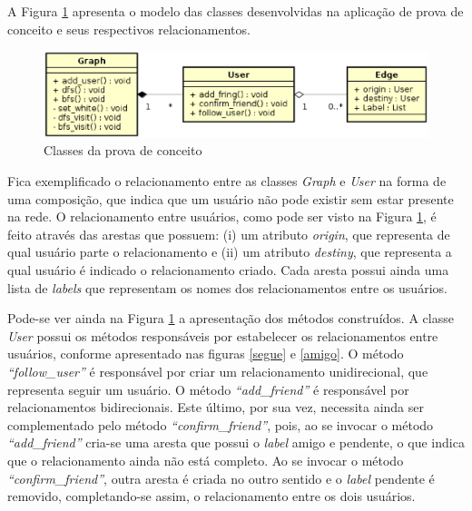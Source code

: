 \begin{apendicesenv}
A Figura \ref{modelo prova de conceito} apresenta o modelo das classes desenvolvidas na aplicação de prova de conceito e seus respectivos relacionamentos.

\begin{figure}[!h]
	\centering
	\includegraphics[scale=0.8]{figuras/proposta/classes_prova_conceito.eps}
	\caption{Classes da prova de conceito}
	\label{modelo prova de conceito}
\end{figure}

Fica exemplificado o relacionamento entre as classes \textit{Graph} e \textit{User} na forma de uma composição, que indica que um usuário não pode existir sem estar presente na rede. O relacionamento entre usuários, como pode ser visto na Figura \ref{modelo prova de conceito}, é feito através das arestas que possuem: (i) um atributo \textit{origin}, que representa de qual usuário parte o relacionamento e (ii) um atributo \textit{destiny}, que representa a qual usuário é indicado o relacionamento criado. Cada aresta possui ainda uma lista de \textit{labels} que representam os nomes dos relacionamentos entre os usuários.

Pode-se ver ainda na Figura \ref{modelo prova de conceito} a apresentação dos métodos construídos. A classe \textit{User} possui os métodos responsáveis por estabelecer os relacionamentos entre usuários, conforme apresentado nas figuras \ref{segue} e \ref{amigo}. O método \textit{``follow\_user''} é responsável por criar um relacionamento unidirecional, que representa seguir um usuário. O método \textit{``add\_friend''} é responsável por relacionamentos bidirecionais. Este último, por sua vez, necessita ainda ser complementado pelo método \textit{``confirm\_friend''}, pois, ao se invocar o método \textit{``add\_friend''} cria-se uma aresta que possui o \textit{label} amigo e pendente, o que indica que o relacionamento ainda não está completo. Ao se invocar o método \textit{``confirm\_friend''}, outra aresta é criada no outro sentido e o \textit{label} pendente é removido, completando-se assim, o relacionamento entre os dois usuários.


\end{apendicesenv}
